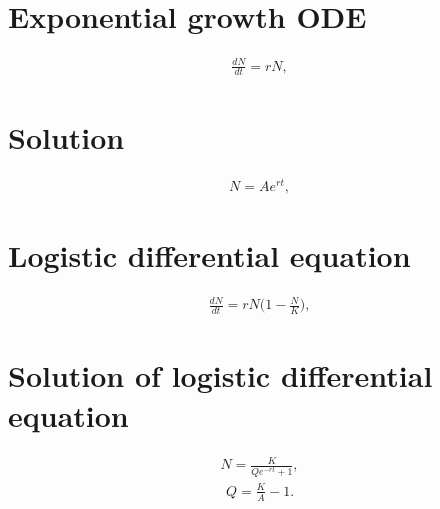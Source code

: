 \section*{Exponential growth ODE}

\begin{align*}
    \frac{dN}{dt} = r N,
\end{align*}


\section*{Solution}

\begin{align*}
    N = A e^{r t},
\end{align*}

\section*{Logistic differential equation }

\begin{align*}
    \frac{dN}{dt} = r N \Big(1 - \frac{N}{K} \Big),
\end{align*}


\section*{Solution of logistic differential equation }

\begin{align*}
    N = \frac{K}{Q e^{-r t} + 1},
\end{align*}
\begin{align*}
    Q = \frac{K}{A} - 1.
\end{align*}
